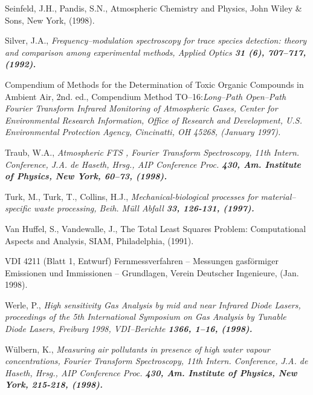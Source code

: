 \begin{thebibliography}{giese-bogdan,199797}
 Seinfeld, J.H., Pandis, S.N.,
Atmospheric Chemistry and Physics, John Wiley \& Sons, New York,
(1998).

 Silver, J.A., \it
Frequency--modulation spectroscopy for trace species detection:
theory and comparison among experimental methods\rm , Applied
Optics \bf 31 \rm (6), 707--717, (1992).

 Compendium of
Methods for the Determination of Toxic Organic Compounds in
Ambient Air, 2nd. ed., Compendium Method TO--16:\it Long--Path
Open--Path Fourier Transform Infrared Monitoring of Atmospheric
Gases\rm , Center for Environmental Research Information, Office
of Research and Development, U.S. Environmental Protection Agency,
Cincinatti, OH 45268, (January 1997).


Traub, W.A., \it Atmospheric FTS\rm
, Fourier Transform Spectroscopy, 11th Intern. Conference, J.A. de
Haseth, Hrsg., AIP Conference Proc. \bf 430\rm , Am. Institute of
Physics, New York, 60--73, (1998).

 Turk, M., Turk, T., Collins, H.J.,
\it Mechanical-biological processes for material--specific waste
processing\rm , Beih. M\"{u}ll Abfall \bf 33\rm , 126-131, (1997).

 Van Huffel, S.,
Vandewalle, J., The Total Least Squares Problem: Computational
Aspects and Analysis, SIAM, Philadelphia, (1991).

 VDI 4211 (Blatt 1, Entwurf) Fernmessverfahren -- Messungen
gasf\"{o}rmiger Emissionen und Immissionen -- Grundlagen, Verein
Deutscher Ingenieure, (Jan. 1998).

 Werle, P., \it High sensitivity Gas
Analysis by mid and near Infrared Diode Lasers\rm , proceedings of
the 5th International Symposium on Gas Analysis by Tunable Diode
Lasers, Freiburg 1998, VDI--Berichte \bf 1366\rm , 1--16, (1998).

 W\"{u}lbern, K., \it Measuring air pollutants in presence of
high water vapour concentrations\rm , Fourier Transform
Spectroscopy, 11th Intern. Conference, J.A. de Haseth, Hrsg., AIP
Conference Proc. \bf 430\rm , Am. Institute of Physics, New York,
215-218, (1998).


\end{thebibliography}
